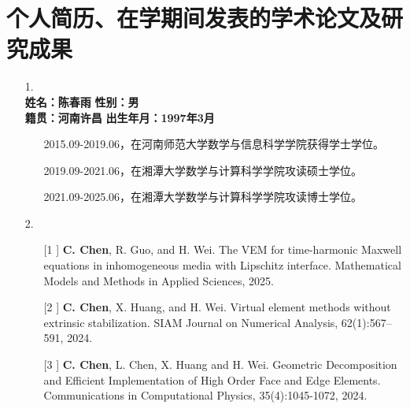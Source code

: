 
\chapter*{个人简历、在学期间发表的学术论文及研究成果}
\begin{itemize}
    \item[1.] {}\\
        \textbf{姓名：陈春雨}     
        \hspace{3.0cm}
        \textbf{性别：男} \\
        \textbf{籍贯：河南许昌}  
        \hspace{2.6cm}
        \textbf{出生年月：1997年3月}
    \begin{itemize}
        \setlength{\leftmargin}{1.5em}  %
        \setlength{\itemindent}{-1em}   %
        \item[\textbullet]
            2015.09-2019.06，在河南师范大学数学与信息科学学院获得学士学位。
        \item[\textbullet]
            2019.09-2021.06，在湘潭大学数学与计算科学学院攻读硕士学位。
        \item[\textbullet]
            2021.09-2025.06，在湘潭大学数学与计算科学学院攻读博士学位。
    \end{itemize}
\item[2.] {}
    \begin{itemize}
    \setlength{\leftmargin}{1.5em}  %
    \setlength{\itemindent}{-1em}   %
    \item [[1]]
        \textbf{C. Chen}, R. Guo, and H. Wei. The VEM for time-harmonic
        Maxwell equations in inhomogeneous media with Lipschitz interface.
        Mathematical Models and Methods in Applied Sciences, 2025.

    \item [[2]]
        \textbf{C. Chen}, X. Huang, and H. Wei. Virtual element methods
        without extrinsic stabilization. SIAM Journal on Numerical Analysis,
        62(1):567–591, 2024.

    \item [[3]]
        \textbf{C. Chen}, L. Chen, X. Huang and H. Wei. Geometric Decomposition
        and Efficient Implementation of High Order Face and Edge Elements.
        Communications in Computational Physics, 35(4):1045-1072, 2024.


\end{itemize}
\end{itemize}
